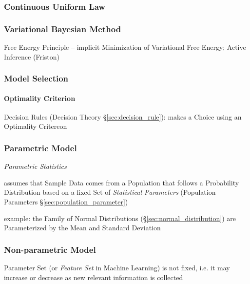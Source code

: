 \subsubsection{Continuous Uniform Law}\label{sec:continuous_uniform_law}

\subsubsection{Variational Bayesian Method}
\label{sec:variational_bayesian_method}

Free Energy Principle -- implicit Minimization of Variational Free Energy;
Active Inference (Friston)



\subsubsection{Model Selection}\label{sec:model_selection}

\paragraph{Optimality Criterion}\label{sec:optimality_criterion}\hfill

\fist Decision Rules (Decision Theory \S\ref{sec:decision_rule}): makes a
Choice using an Optimality Critereon



\subsubsection{Parametric Model}\label{sec:parametric_model}

\emph{Parametric Statistics}

assumes that Sample Data comes from a Population that follows a Probability
Distribution based on a fixed Set of \emph{Statistical Parameters}
(Population Parameters \S\ref{sec:population_parameter})

example: the Family of Normal Distributions (\S\ref{sec:normal_distribution})
are Parameterized by the Mean and Standard Deviation



\subsubsection{Non-parametric Model}\label{sec:nonparametric_model}

Parameter Set (or \emph{Feature Set} in Machine Learning) is not fixed, i.e. it
may increase or decrease as new relevant information is collected



